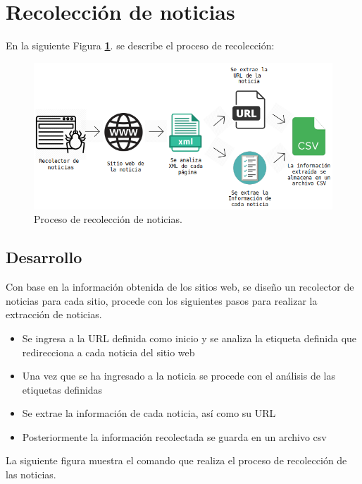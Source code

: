 \section{Recolección de noticias}
En la siguiente Figura \textbf{\ref{fig:diagrama}}. se describe el proceso de recolección:

\begin{figure}[H]
  \centering
  \includegraphics[scale=.50]{imagenes/Capitulo5/diagrama}
  \caption{Proceso de recolección de noticias.}
  \label{fig:diagrama}
\end{figure}

\subsection{Desarrollo}

Con base en la información obtenida de los sitios web, se diseño un recolector de noticias para cada sitio, procede con 
los siguientes pasos para realizar la extracción de noticias.

\begin{itemize}
  \item Se ingresa a la URL definida como inicio y se analiza la etiqueta definida que redirecciona a cada noticia del sitio web
  \item Una vez que se ha ingresado a la noticia se procede con el análisis de las etiquetas definidas
  \item Se extrae la información de cada noticia, así como su URL
  \item Posteriormente la información recolectada se guarda en un archivo csv
\end{itemize}
La siguiente figura muestra el comando que realiza el proceso de recolección de las noticias.

